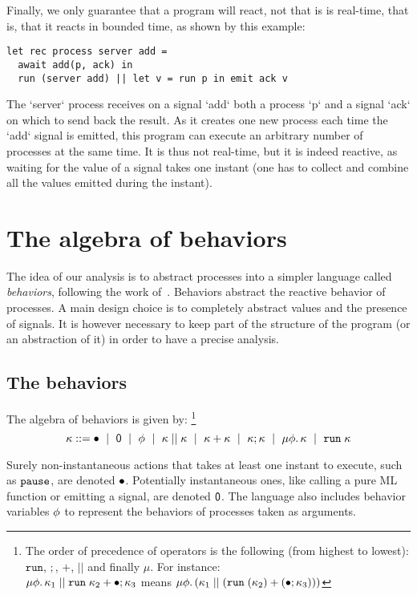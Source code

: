 \documentclass[9pt,preprint]{sigplanconf}
\newcommand{\sdeq}{::=}
\begin{document}
Finally, we only guarantee that a program will react, not that is is real-time, that is, that it reacts in bounded time, as shown by this example:
\begin{lstlisting}
let rec process server add =
  await add(p, ack) in
  run (server add) || let v = run p in emit ack v
\end{lstlisting}
%
The `server` process receives on a signal `add` both a process `p` and a signal `ack` on which to send back the result. As it creates one new process each time the `add` signal is emitted, this program can execute an arbitrary number of processes at the same time. It is thus not real-time, but it is indeed reactive, as waiting for the value of a signal takes one instant (one has to collect and combine all the values emitted during the instant).

\section{The algebra of behaviors}
\label{sec:behaviors}



The idea of our analysis is to abstract processes into a simpler language called \emph{behaviors}, following the work of~\cite{Amtoft:1999}. Behaviors abstract the reactive behavior of processes. A main design choice is to completely abstract values and the presence of signals. It is however necessary to keep part of the structure of the program (or an abstraction of it) in order to have a precise analysis.

\subsection{The behaviors}

The algebra of behaviors is given by:
\footnote{The order of precedence of operators is the following (from highest to lowest): $\mathtt{run}$, $;$, $+$, $||$ and finally $\mu$. For instance: \\
$ \mu \phi.\, \kappa_1 \mid\mid \mathtt{run}\; \kappa_2 + \bullet ; \kappa_3 $
means
$ \mu \phi.\, (\kappa_1 \mid\mid (\mathtt{run}\; (\kappa_2) + (\bullet ; \kappa_3))) $
}
%
\[
\rk \sdeq \effplus ~\mid~ \effmin ~\mid~ \effvar ~\mid~ \effpar{\rk}{\rk} ~\mid~ \effor{\rk}{\rk}
~\mid~ \effcon{\rk}{\rk}  ~\mid~ \effrec{\effvar}{\rk}  ~\mid~ \effrun{\rk}
\]

Surely non-instantaneous actions that takes at least one instant to execute, such as $\mathtt{pause}$, are denoted $\bullet$. Potentially instantaneous ones, like calling a pure ML function or emitting a signal, are denoted $\textsf{0}$. The language also includes behavior variables $\phi$ to represent the behaviors of processes taken as arguments. 
\end{document}
